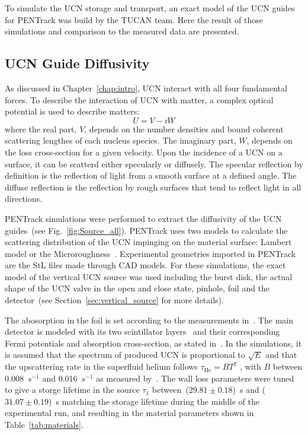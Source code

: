 To simulate the UCN storage and transport, an exact model of the UCN
guides for PENTrack was build by the TUCAN team. Here the result of
those simulations and comparison to the measured data are presented.
\subsection{UCN Guide Diffusivity\label{sec:diffusivity}}
As discussed in Chapter~\ref{chap:intro}, UCN interact with all four
fundamental forces. To describe the interaction of UCN with matter, a
complex optical potential is used to describe matters:
\begin{equation}
  \label{eqn:fermipotential}
  U = V - iW
\end{equation}
where the real part, $V$, depends on the number densities and bound
coherent scattering lengthes of each nucleus species. The imaginary
part, $W$, depends on the loss cross-section for a given velocity.
Upon the incidence of a UCN on a surface, it can be scatterd either
specularly or diffusely. The specular reflection by definition is the
reflection of light from a smooth surface at a defined angle. The
diffuse reflection is the reflection by rough surfaces that tend to
reflect light in all directions.

PENTrack simulations were performed to extract the diffusivity of the
UCN guides~(see Fig.~\ref{fig:Source_all}). PENTrack uses two models
to calculate the scattering distribution of the UCN impinging on the
material surface: Lambert model or the
Microroughness~\cite{Steyerl1972}. Experimental geometries imported in
PENTrack are the StL files made through CAD models. For these
simulations, the exact model of the vertical UCN source was used
including the burst disk, the actual shape of the UCN valve in the
open and close state, pinhole, foil and the detector~(see
Section~\ref{sec:vertical_source} for more details).

The abosorption in the foil is set according to the measurements
in~\cite{atchison2009transmission}. The main detector is modeled with
its two scintillator layers~\cite{jamieson2017characterization} and
their corresponding Fermi potentials and absorption cross-section, as
stated in~\cite{Ban2016}. In the simulations, it is assumed that the
spectrum of produced UCN is proportional to $\sqrt{E}$ and that the
upscattering rate in the superfluid helium follows
$\tau_\mathrm{He} = B T^7$ , with $B$ between 0.008~$s^{-1}$ and
0.016~$s^{-1}$ as measured by~\cite{Leung2016}. The wall loss
parameters were tuned to give a storge lifetime in the source $\tau_1$
between~($29.81 \pm 0.18$)~s and ($31.07 \pm 0.19$)~s matching the
storage lifetime during the middle of the experimental run, and
resulting in the material parameters shown in
Table~\ref{tab:materials}.



